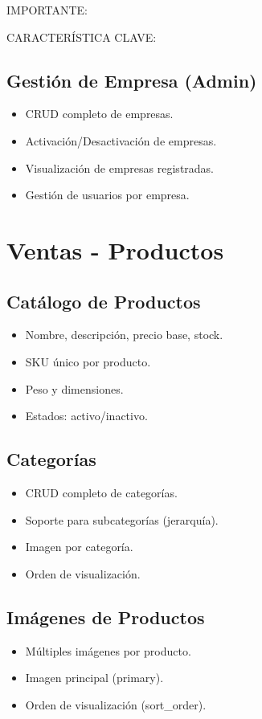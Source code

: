 \documentclass[12pt,a4paper,oneside]{book}
\begin{document}
\begin{alert}{IMPORTANTE:}
\begin{info}{CARACTERÍSTICA CLAVE:}
\subsection{Gestión de Empresa (Admin)}
\begin{itemize}
    \item CRUD completo de empresas.
    \item Activación/Desactivación de empresas.
    \item Visualización de empresas registradas.
    \item Gestión de usuarios por empresa.
\end{itemize}

\section{Ventas - Productos}
\label{sec:productos}

\subsection{Catálogo de Productos}
\begin{itemize}
    \item Nombre, descripción, precio base, stock.
    \item SKU único por producto.
    \item Peso y dimensiones.
    \item Estados: activo/inactivo.
\end{itemize}

\subsection{Categorías}
\begin{itemize}
    \item CRUD completo de categorías.
    \item Soporte para subcategorías (jerarquía).
    \item Imagen por categoría.
    \item Orden de visualización.
\end{itemize}

\subsection{Imágenes de Productos}
\begin{itemize}
    \item Múltiples imágenes por producto.
    \item Imagen principal (primary).
    \item Orden de visualización (sort\_order).
\end{itemize}


\end{info}
\end{alert}
\end{document}
